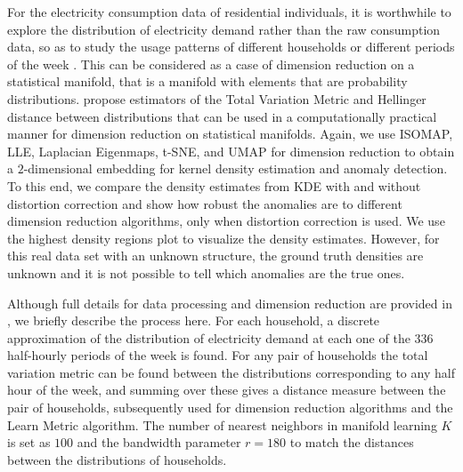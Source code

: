 \documentclass[11pt,a4paper,]{article}
\begin{document}
For the electricity consumption data of residential individuals, it is worthwhile to explore the distribution of electricity demand rather than the raw consumption data, so as to study the usage patterns of different households or different periods of the week \autocite{Hyndman2018-ia}. This can be considered as a case of dimension reduction on a statistical manifold, that is a manifold with elements that are probability distributions. \textcite{Cheng2021-dh} propose estimators of the Total Variation Metric and Hellinger distance between distributions that can be used in a computationally practical manner for dimension reduction on statistical manifolds. Again, we use ISOMAP, LLE, Laplacian Eigenmaps, t-SNE, and UMAP for dimension reduction to obtain a \(2\)-dimensional embedding for kernel density estimation and anomaly detection. To this end, we compare the density estimates from KDE with and without distortion correction and show how robust the anomalies are to different dimension reduction algorithms, only when distortion correction is used. We use the highest density regions plot to visualize the density estimates. However, for this real data set with an unknown structure, the ground truth densities are unknown and it is not possible to tell which anomalies are the true ones.

Although full details for data processing and dimension reduction are provided in \textcite{Cheng2021-dh}, we briefly describe the process here. For each household, a discrete approximation of the distribution of electricity demand at each one of the \(336\) half-hourly periods of the week is found. For any pair of households the total variation metric can be found between the distributions corresponding to any half hour of the week, and summing over these gives a distance measure between the pair of households, subsequently used for dimension reduction algorithms and the Learn Metric algorithm. The number of nearest neighbors in manifold learning \(K\) is set as \(100\) and the bandwidth parameter \(r=180\) to match the distances between the distributions of households.
\end{document}
